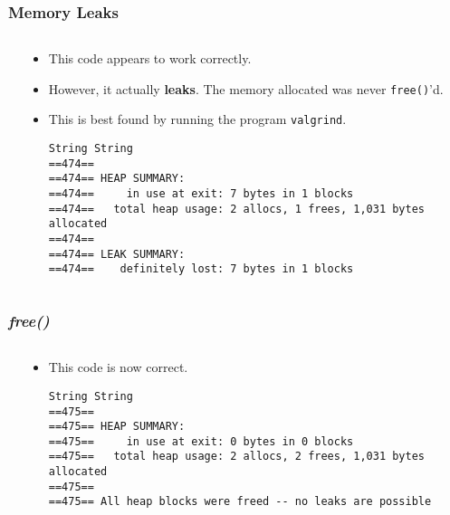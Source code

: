 \begin{frame}[fragile]
\frametitle{Memory Leaks}
\begin{columns}[T]

\begin{column}{0.45\textwidth}

\end{column}

\pause
\begin{column}{0.45\textwidth}
\begin{itemize}[<+->]
\item This code appears to work correctly.
\item However, it actually {\bf leaks}. The memory
allocated was never \verb^free()^'d.
\item This is best found by running the program \verb^valgrind^.
{\tiny
\begin{verbatim}
String String
==474==
==474== HEAP SUMMARY:
==474==     in use at exit: 7 bytes in 1 blocks
==474==   total heap usage: 2 allocs, 1 frees, 1,031 bytes allocated
==474==
==474== LEAK SUMMARY:
==474==    definitely lost: 7 bytes in 1 blocks
\end{verbatim}
}
\end{itemize}
\end{column}

\end{columns}
\end{frame}


\begin{frame}[fragile]
\frametitle{{\em free()}}
\begin{columns}[T]

\begin{column}{0.45\textwidth}

\end{column}

\pause
\begin{column}{0.45\textwidth}
\begin{itemize}[<+->]
\item This code is now correct.
{\tiny
\begin{verbatim}
String String
==475==
==475== HEAP SUMMARY:
==475==     in use at exit: 0 bytes in 0 blocks
==475==   total heap usage: 2 allocs, 2 frees, 1,031 bytes allocated
==475==
==475== All heap blocks were freed -- no leaks are possible
\end{verbatim}
}
\end{itemize}
\end{column}

\end{columns}
\end{frame}



